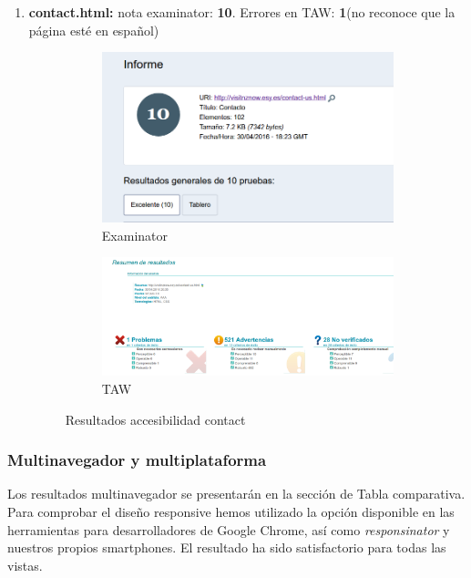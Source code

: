\begin{enumerate}
	
	\item \textbf{contact.html: }nota examinator: \textbf{10}. Errores en TAW: \textbf{1}(no reconoce que la página esté en español)
	\begin{figure}
		\centering
		\begin{subfigure}{.5\textwidth}
			\centering
			\includegraphics[width=.8\linewidth]{./Fotos/exa-contact.png}
			\caption{Examinator}
			\label{fig: Examinator contact}
		\end{subfigure}%
		\begin{subfigure}{.5\textwidth}
			\centering
			\includegraphics[width=.8\linewidth]{./Fotos/taw-contact.png}
			\caption{TAW}
			\label{fig: TAW contactsub2}
		\end{subfigure}
		\caption{Resultados accesibilidad contact}
		\label{fig: Resultados accesibilidad contact}
	\end{figure}
\end{enumerate}

\subsubsection{Multinavegador y multiplataforma}
Los resultados multinavegador se presentarán en la sección de Tabla comparativa.\\
Para comprobar el diseño responsive hemos utilizado la opción disponible en las herramientas para desarrolladores de Google Chrome, así como \textit{responsinator} y nuestros propios smartphones. El resultado ha sido satisfactorio para todas las vistas.

